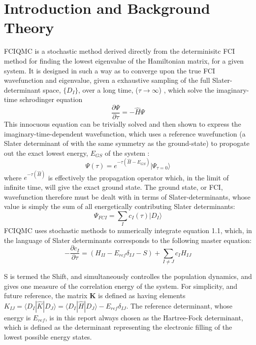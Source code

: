 \documentclass[final,3p,times,twocolumn]{elsarticle}
\numberwithin{equation}{section}
\begin{document}

\section{Introduction and Background Theory}
FCIQMC is a stochastic method derived directly from the determinisitc FCI method for finding the lowest eigenvalue of the Hamiltonian matrix, for a given system. It is designed in such a way as to converge upon the true FCI wavefunction and eigenvalue, given a exhaustive sampling of the full Slater-determinant space, $\{D_I\}$, over a long time, ($\tau \rightarrow \infty$) , which solve the imaginary-time schrodinger equation
\begin{equation}
\frac{\partial \Psi }{\partial \tau} = -\hat H \Psi
\end{equation}
This innocuous equation can be trivially solved and then shown to express the imaginary-time-dependent wavefunction, which uses a reference wavefunction (a Slater determinant of with the same symmetry as the ground-state) to propogate out the exact lowest energy, $E_{GS}$ of the system :
\begin{equation}
\Psi(\tau) = e^{-\tau(\hat H - E_{GS})}|\Psi_{\tau = 0} \rangle 
\end{equation}
where $e^{-\tau(\hat H)}$ is effectively the propagation operator which, in the limit of infinite time, will give the exact ground state. The ground state, or FCI, wavefunction therefore must be dealt with in terms of Slater-determinants, whose value is simply the sum of all energetically contributing Slater determinants:
\begin{equation}
\Psi_{FCI} = \sum_{I} c_I (\tau) | D_I \rangle
\end{equation}
FCIQMC uses stochastic methods to numerically integrate equation 1.1, which, in the language of Slater determinants corresponds to the following master equation:
\begin{equation}
-\frac{\partial c_I}{\partial \tau} = (H_{II} - E_{ref}\delta_{IJ} - S) + \sum_{I \neq J} c_I H_{IJ}
\end{equation}

S is termed the Shift, and simultaneously controlles the population dynamics, and gives one measure of the correlation energy of the system. For simplicity, and future reference, the matrix \textbf{K} is defined as having elements $K_{IJ} = \langle D_I | \hat K | D_J \rangle = \langle D_I | \hat H | D_J \rangle - E_{ref}\delta_{IJ} $.  
The reference determinant, whose energy is $E_{ref}$, is in this report always chosen as the Hartree-Fock determinant, which is defined as the determinant representing the electronic filling of the lowest possible energy states.\\
\end{document}
